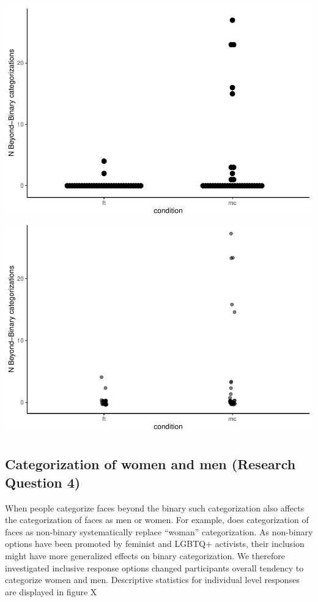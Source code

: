 \documentclass[
  man]{apa7}
\begin{document}
\includegraphics{RO_revisions_doc_files/figure-latex/unnamed-chunk-5-1.pdf} \includegraphics{RO_revisions_doc_files/figure-latex/unnamed-chunk-5-2.pdf}

\hypertarget{categorization-of-women-and-men-research-question-4}{%
\subsection{Categorization of women and men (Research Question 4)}\label{categorization-of-women-and-men-research-question-4}}

When people categorize faces beyond the binary such categorization also affects the categorization of faces as men or women. For example, does categorization of faces as non-binary systematically replace ``woman'' categorization. As non-binary options have been promoted by feminist and LGBTQ+ activists, their inclusion might have more generalized effects on binary categorization. We therefore investigated inclusive response options changed participants overall tendency to categorize women and men. Descriptive statistics for individual level responses are displayed in figure X
\end{document}
